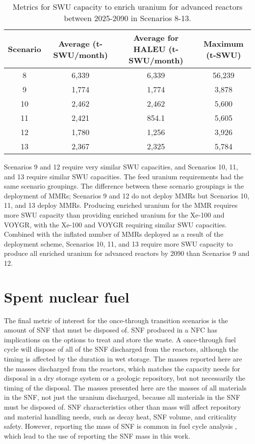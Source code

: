 \begin{table}[h!]
    \centering 
    \caption{Metrics for \gls{SWU} capacity to enrich uranium for 
    advanced reactors between 2025-2090 in Scenarios 8-13.}
    \label{tab:1percent_swu}
    \begin{tabular}{c c c c}
        \hline
        Scenario & Average (t-SWU/month) & Average  
        for \gls{HALEU} (t-SWU/month) & Maximum (t-SWU)\\\hline
        8 & 6,339 & 6,339 & 56,239 \\
        9 & 1,774 & 1,774 & 3,878\\
        10 & 2,462 & 2,462 & 5,600\\
        11 & 2,421 & 854.1 & 5,605\\
        12 & 1,780 & 1,256 & 3,926\\
        13 & 2,367 & 2,325 & 5,784\\
        \hline
    \end{tabular}
\end{table}

Scenarios 9 and 12 require very similar \gls{SWU} capacities, and 
Scenarios 10, 11, and 13 require similar \gls{SWU} capacities. 
The feed uranium requirements had the same scenario groupings. 
The difference between these scenario groupings is the deployment 
of \glspl{MMR}; Scenarios 9 and 12 do not deploy \glspl{MMR} but 
Scenarios 10, 11, and 13 deploy \glspl{MMR}. Producing enriched uranium 
for the \gls{MMR} requires more \gls{SWU} capacity than providing 
enriched uranium for the Xe-100 and VOYGR, with the Xe-100 and VOYGR 
requiring similar \gls{SWU} capacities. Combined with the inflated 
number of \glspl{MMR} deployed as a result of the deployment scheme, 
Scenarios 10, 11, and 13 require more \gls{SWU} capacity to produce 
all enriched uranium for advanced reactors by 2090 than Scenarios 9 and 12. 

\section{Spent nuclear fuel}
The final metric of interest for the once-through transition scenarios is 
the amount of \gls{SNF} that must be disposed of.
\gls{SNF} produced in a \gls{NFC} has implications on the options 
to treat and store the waste. A once-through fuel cycle will dispose of 
all of the \gls{SNF} discharged from the reactors, although 
the timing is affected by the duration in wet storage. The masses 
reported here are the masses discharged from the reactors, which 
matches the capacity needs for disposal in a dry storage system or a 
geologic repository, but not necessarily the timing of the disposal.
The masses 
presented here are the masses of all materials in the \gls{SNF}, not just 
the uranium discharged, because all materials in the \gls{SNF} must be 
disposed of. \gls{SNF} characteristics other than mass will affect repository 
and material handling needs, such as decay heat, \gls{SNF} volume, and 
criticality safety. However, reporting the mass of \gls{SNF} is common in 
fuel cycle analysis \cite{sunny_transition_2015,feng_standardized_2016,bae_standardized_2019},
which lead to the use of reporting the \gls{SNF} mass in this work. 


